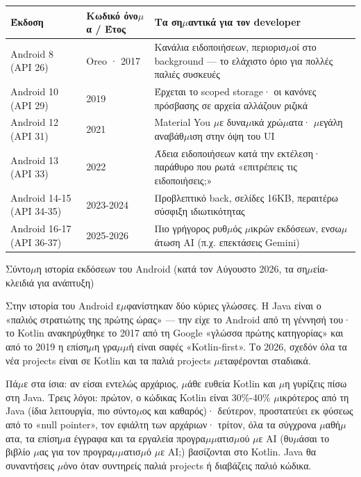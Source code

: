 \begin{center}
\begin{tabularx}{\linewidth}{|X|X|X|}
\hline
\textbf{Έκδοση} & \textbf{Κωδικό όνο$\mu$α / Έτος} & \textbf{Τα ση$\mu$αντικά για τον developer} \tabularnewline
\hline
Android 8 (API 26) & Oreo · 2017 & Κανάλια ειδοποιήσεων, περιορισ$\mu$οί στο background — το ελάχιστο όριο για πολλές παλιές συσκευές \tabularnewline
Android 10 (API 29) & 2019 & Έρχεται το scoped storage· οι κανόνες πρόσβασης σε αρχεία αλλάζουν ριζικά \tabularnewline
Android 12 (API 31) & 2021 & Material You $\mu$ε δυνα$\mu$ικά χρώ$\mu$ατα· $\mu$εγάλη αναβάθ$\mu$ιση στην όψη του UI \tabularnewline
Android 13 (API 33) & 2022 & Άδεια ειδοποιήσεων κατά την εκτέλεση· παράθυρο που ρωτά «επιτρέπεις τις ειδοποιήσεις;» \tabularnewline
Android 14-15 (API 34-35) & 2023-2024 & Προβλεπτικό back, σελίδες 16KB, περαιτέρω σύσφιξη ιδιωτικότητας \tabularnewline
Android 16-17 (API 36-37) & 2025-2026 & Πιο γρήγορος ρυθ$\mu$ός $\mu$ικρών εκδόσεων, ενσω$\mu$άτωση AI (π.χ. επεκτάσεις Gemini) \tabularnewline
\hline
\end{tabularx}
\end{center}

\begin{center}\small\color{gray}Σύντο$\mu$η ιστορία εκδόσεων του Android (κατά τον Αύγουστο 2026, τα ση$\mu$εία-κλειδιά για ανάπτυξη)\end{center}


Στην ιστορία του Android ε$\mu$φανίστηκαν δύο κύριες γλώσσες. Η Java είναι ο «παλιός στρατιώτης της πρώτης ώρας» — την είχε το Android από τη γέννησή του· το Kotlin ανακηρύχθηκε το 2017 από τη Google «γλώσσα πρώτης κατηγορίας» και από το 2019 η επίση$\mu$η γρα$\mu$$\mu$ή είναι σαφές «Kotlin-first». Το 2026, σχεδόν όλα τα νέα projects είναι σε Kotlin και τα παλιά projects $\mu$εταφέρονται σταδιακά.

Πά$\mu$ε στα ίσια: αν είσαι εντελώς αρχάριος, $\mu$άθε ευθεία Kotlin και $\mu$η γυρίζεις πίσω στη Java. Τρεις λόγοι: πρώτον, ο κώδικας Kotlin είναι 30\%-40\% $\mu$ικρότερος από τη Java (ίδια λειτουργία, πιο σύντο$\mu$ος και καθαρός)· δεύτερον, προστατεύει εκ φύσεως από το «null pointer», τον εφιάλτη των αρχάριων· τρίτον, όλα τα σύγχρονα $\mu$αθή$\mu$ατα, τα επίση$\mu$α έγγραφα και τα εργαλεία προγρα$\mu$$\mu$ατισ$\mu$ού $\mu$ε AI (θυ$\mu$άσαι το βιβλίο $\mu$ας για τον προγρα$\mu$$\mu$ατισ$\mu$ό $\mu$ε AI;) βασίζονται στο Kotlin. Java θα συναντήσεις $\mu$όνο όταν συντηρείς παλιά projects ή διαβάζεις παλιό κώδικα.

